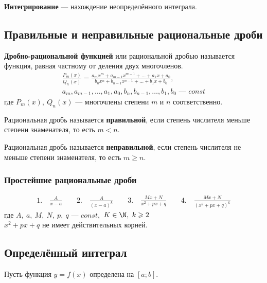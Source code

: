 \begin{definition}
    \textbf{Интегрирование} --- нахождение неопределённого интеграла.
\end{definition}

\subsection{Правильные и неправильные рациональные дроби}

\begin{definition}
    \textbf{Дробно-рациональной функцией} или рациональной дробью называется функция, равная частному от деления двух многочленов.
    \begin{gather*}
        \frac{P_m(x)}{Q_n(x)} = \frac{a_mx^m + a_{m-1}x^{m-1} + \ldots + a_1x + a_0}{b_nx^n + b_{n-1}x^{n-1} + \ldots + b_1x + b_0},\\
        a_m, a_{m-1}, \ldots, a_1, a_0, b_n, b_{n-1}, \ldots, b_1, b_0 \text{ --- } const
    \end{gather*}
    где $P_m(x),\ Q_n(x)$ --- многочлены степени $m$ и $n$ соответственно.
\end{definition}

\begin{definition}
    Рациональная дробь называется \textbf{правильной}, если степень числителя меньше степени знаменателя, то есть $m < n$.
\end{definition}

\begin{definition}
    Рациональная дробь называется \textbf{неправильной}, если степень числителя не меньше степени знаменателя, то есть $m \geqslant n$.
\end{definition}

\subsubsection{Простейшие рациональные дроби}

\begin{gather*}
            1.\quad \frac{A}{x - a}\qquad
            2.\quad \frac{A}{(x-a)^k}\qquad
            3.\quad \frac{Mx + N}{x^2 + px + q}\qquad
            4.\quad \frac{Mx + N}{(x^2 + px + q)^k}
\end{gather*}
где $A,\ a,\ M,\ N,\ p,\ q$ --- $const$,\ $K\in \N,\ k \geqslant 2$\\
$x^2 + px + q$ не имеет действительных корней.

\newpage
\subsection{Определённый интеграл}
Пусть функция $y = f(x)$ определена на $[a;b]$.

